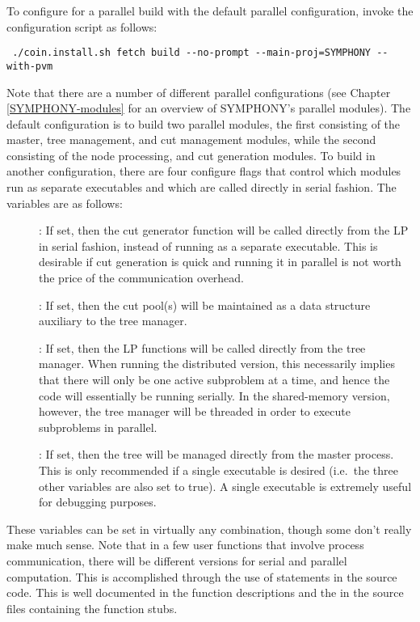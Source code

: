 
To configure for a parallel build with the default parallel configuration,
invoke the configuration script as follows:
{\color{Brown}
\begin{verbatim}
 ./coin.install.sh fetch build --no-prompt --main-proj=SYMPHONY --with-pvm
\end{verbatim}
} 
Note that there are a number of different parallel configurations (see
Chapter \ref{SYMPHONY-modules} for an overview of SYMPHONY's parallel
modules). The default configuration is to build two parallel modules, the
first consisting of the master, tree management, and cut management modules,
while the second consisting of the node processing, and cut generation
modules. To build in another configuration, there are four configure flags
that control which modules run as separate executables and which are called
directly in serial fashion. The variables are as follows:
\begin{description}
        \item[] : If set, then the cut generator function will
        be called directly from the LP in serial fashion, instead of running
        as a separate executable. This is desirable if cut generation is quick
        and running it in parallel is not worth the price of the communication
        overhead.
        \item[] : If set, then the cut pool(s) will be
        maintained as a data structure auxiliary to the tree manager.
        \item[] : If set, then the LP functions will be called
        directly from the tree manager. When running the distributed version,
        this necessarily implies that there will only be one active subproblem
        at a time, and hence the code will essentially be running serially. In
        the shared-memory version, however, the tree manager will be threaded
        in order to execute subproblems in parallel.
        \item[] : If set, then the tree will be managed
        directly from the master process. This is only recommended if a single
        executable is desired (i.e.~the three other variables are also set to
        true). A single executable is extremely useful for debugging purposes.
\end{description}
These variables can be set in virtually any combination, though some
don't really make much sense. Note that in a few user functions that
involve process communication, there will be different versions for
serial and parallel computation. This is accomplished through the use
of  statements in the source code. This is well documented
in the function descriptions and the in the source files containing
the function stubs.

